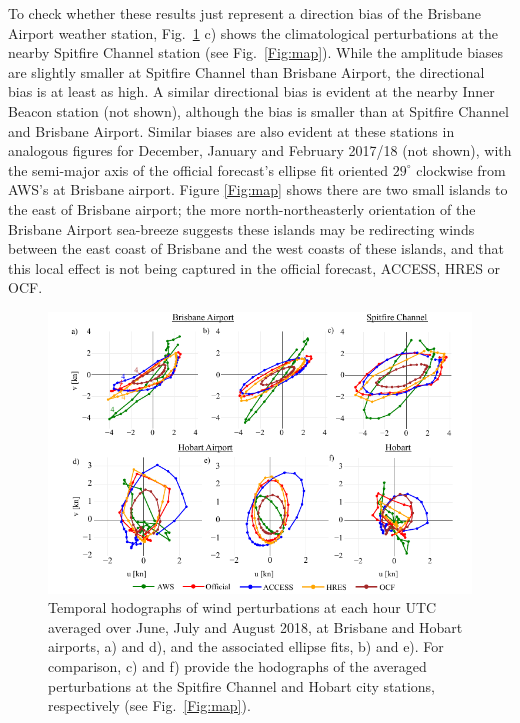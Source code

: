 \documentclass[twocol]{ametsoc}
\begin{document}
To check whether these results just represent a direction bias of the Brisbane Airport weather station, Fig.~\ref{Fig:ellipse_hodo} c) shows the climatological perturbations at the nearby Spitfire Channel station (see Fig.~\ref{Fig:map}). While the amplitude biases are slightly smaller at Spitfire Channel than Brisbane Airport, the directional bias is at least as high. A similar directional bias is evident at the nearby Inner Beacon station (not shown), although the bias is smaller than at Spitfire Channel and Brisbane Airport. Similar biases are also evident at these stations in analogous figures for December, January and February 2017/18 (not shown), with the semi-major axis of the official forecast's ellipse fit oriented $29^\circ$ clockwise from AWS's at Brisbane airport. Figure \ref{Fig:map} shows there are two small islands to the east of Brisbane airport; the more north-northeasterly orientation of the Brisbane Airport sea-breeze suggests these islands may be redirecting winds between the east coast of Brisbane and the west coasts of these islands, and that this local effect is not being captured in the official forecast, ACCESS, HRES or OCF. 

\begin{figure}
\centering
\includegraphics[width=33pc]{ellipse_hodo.pdf}
\caption{Temporal hodographs of wind perturbations at each hour UTC averaged over June, July and August 2018, at Brisbane and Hobart airports, a) and d), and the associated ellipse fits, b) and e). For comparison, c) and f) provide the hodographs of the averaged perturbations at the Spitfire Channel and Hobart city stations, respectively (see Fig.~\ref{Fig:map}).}
\label{Fig:ellipse_hodo}
\end{figure}
\end{document}
